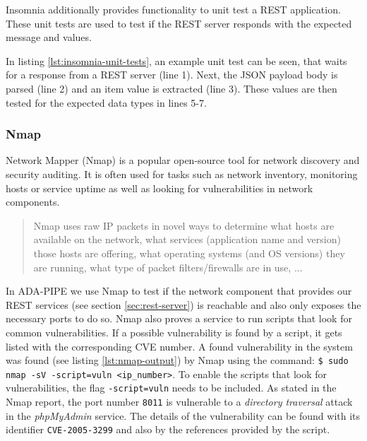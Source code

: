\documentclass{article}
\begin{document}
                Insomnia additionally provides functionality to unit test \cite{konginc.UnitTestingInsomnia} a REST application. These unit tests are used to test if the REST server responds with the expected message and values.

                
                In listing \ref{lst:insomnia-unit-tests}, an example unit test can be seen, that waits for a response from a REST server (line 1). Next, the JSON payload body is parsed (line 2) and an item value is extracted (line 3).
                These values are then tested for the expected data types in lines 5-7.
                                   

            \subsubsection*{Nmap}
            \label{sec:nmap-server}

                Network Mapper (Nmap) is a popular open-source tool for network discovery and security auditing. It is often used for tasks such as network inventory, monitoring hosts or service uptime as well as looking for vulnerabilities in network components.

                \begin{quote}
                    Nmap uses raw IP packets in novel ways to determine what hosts are available on the network, what services (application name and version) those hosts are offering, what operating systems (and OS versions) they are running, what type of packet filters/firewalls are in use, ... \cite{NmapNetworkMapper}
                \end{quote}
                In ADA-PIPE we use Nmap to test if the network component that provides our REST services (see section \ref{sec:rest-server}) is reachable and also only exposes the necessary ports to do so. Nmap also proves a service to run scripts that look for common vulnerabilities. If a possible vulnerability is found by a script, it gets listed with the corresponding CVE number.
                A found vulnerability in the system was found (see listing \ref{lst:nmap-output}) by Nmap using the command: \texttt{\$ sudo nmap -sV -script=vuln <ip\_number>}. To enable the scripts that look for vulnerabilities, the flag \texttt{-script=vuln} needs to be included. 
                As stated in the Nmap report, the port number \texttt{8011} is vulnerable to a \emph{directory traversal} attack in the \emph{phpMyAdmin} \cite{phpmyadminBringingMySQLWeb} service. The details of the vulnerability can be found with its identifier \texttt{CVE-2005-3299} and also by the references provided by the script.
                
\end{document}
